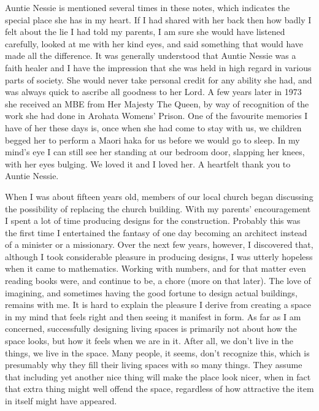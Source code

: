 Auntie Nessie is mentioned several times in these notes, which indicates
the special place she has in my heart. If I had shared with her back
then how badly I felt about the lie I had told my parents, I am sure she
would have listened carefully, looked at me with her kind eyes, and said
something that would have made all the difference. It was generally
understood that Auntie Nessie was a faith healer and I have the
impression that she was held in high regard in various parts of society.
She would never take personal credit for any ability she had, and was
always quick to ascribe all goodness to her Lord. A few years later in
1973 she received an MBE from Her Majesty The Queen, by way of
recognition of the work she had done in Arohata Womens' Prison. One of
the favourite memories I have of her these days is, once when she had
come to stay with us, we children begged her to perform a Maori haka\cite{haka}
for us before we would go to sleep. In
my mind's eye I can still see her standing at our bedroom door, slapping
her knees, with her eyes bulging. We loved it and I loved
her. A heartfelt thank you to Auntie Nessie.

When I was about fifteen years old, members of our local church began
discussing the possibility of replacing the church building. With my
parents' encouragement I spent a lot of time producing designs for the
construction. Probably this was the first time I entertained the fantasy
of one day becoming an architect instead of a minister or a missionary.
Over the next few years, however, I discovered that, although I took
considerable pleasure in producing designs, I was utterly hopeless when
it came to mathematics. Working with numbers, and for that matter even
reading books were, and continue to be, a chore (more on that later).
The love of imagining, and sometimes having the good fortune to design
actual buildings, remains with me. It is hard to explain the pleasure I
derive from creating a space in my mind that feels right and then seeing
it manifest in form. As far as I am concerned, successfully designing
living spaces is primarily not about how the space looks, but how it
feels when we are in it. After all, we don't live in the things, we live
in the space. Many people, it seems, don't recognize this, which is
presumably why they fill their living spaces with so many things. They
assume that including yet another nice thing will make the place look
nicer, when in fact that extra thing might well offend the space,
regardless of how attractive the item in itself might have appeared.

